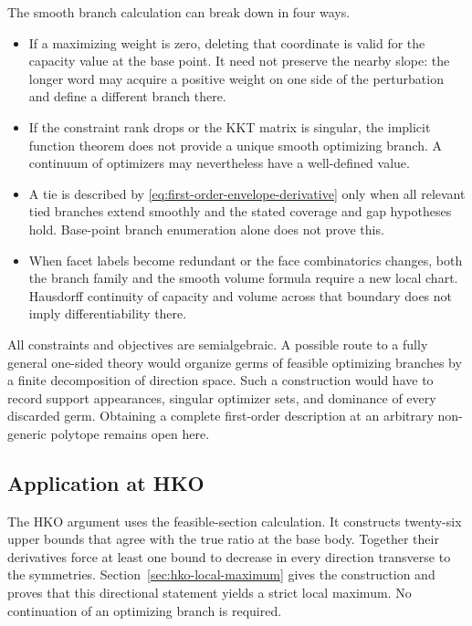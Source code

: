 The smooth branch calculation can break down in four ways.

\begin{itemize}
\item If a maximizing weight is zero, deleting that coordinate is valid for
  the capacity value at the base point.  It need not preserve the nearby
  slope: the longer word may acquire a positive weight on one side of the
  perturbation and define a different branch there.
\item If the constraint rank drops or the KKT matrix is singular, the implicit
  function theorem does not provide a unique smooth optimizing branch.  A
  continuum of optimizers may nevertheless have a well-defined value.
\item A tie is described by \eqref{eq:first-order-envelope-derivative} only
  when all relevant tied branches extend smoothly and the stated coverage
  and gap hypotheses hold.  Base-point branch enumeration alone does not prove
  this.
\item When facet labels become redundant or the face combinatorics changes,
  both the branch family and the smooth volume formula require a new local
  chart.  Hausdorff continuity of capacity and volume across that boundary
  does not imply differentiability there.
\end{itemize}

All constraints and objectives are semialgebraic.  A possible route to a fully
general one-sided theory would organize germs of feasible optimizing branches
by a finite decomposition of direction space.  Such a construction
would have to record support appearances, singular optimizer sets, and
dominance of every discarded germ. Obtaining a complete first-order
description at an arbitrary non-generic polytope remains open here.

\subsection{Application at HKO}
\label{subsec:first-order-hko-upper-functions}

The HKO argument uses the feasible-section calculation. It constructs
twenty-six upper bounds that agree with the true ratio at the base body.
Together their derivatives force at least one bound to decrease in every
direction transverse to the symmetries. Section~\ref{sec:hko-local-maximum}
gives the construction and proves that this directional statement yields
a strict local maximum. No continuation of an optimizing branch is
required.

